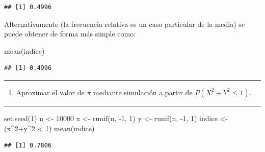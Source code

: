 \documentclass[
]{book}
\newenvironment{Shaded}{\begin{snugshade}}{\end{snugshade}}
\newcommand{\DecValTok}[1]{\textcolor[rgb]{0.00,0.00,0.81}{#1}}
\newcommand{\FunctionTok}[1]{\textcolor[rgb]{0.00,0.00,0.00}{#1}}
\newcommand{\NormalTok}[1]{#1}
\newcommand{\OtherTok}[1]{\textcolor[rgb]{0.56,0.35,0.01}{#1}}
\newcommand{\SpecialCharTok}[1]{\textcolor[rgb]{0.00,0.00,0.00}{#1}}
\providecommand{\tightlist}{%
  \setlength{\itemsep}{0pt}\setlength{\parskip}{0pt}}
\theoremstyle{break}
\theoremstyle{nonumberplain}
\begin{document}
\begin{verbatim}
## [1] 0.4996
\end{verbatim}

Alternativamente (la frecuencia relativa es un caso particular de la media) se puede obtener de forma más simple como:

\begin{Shaded}
\begin{Highlighting}[]
\FunctionTok{mean}\NormalTok{(indice)}
\end{Highlighting}
\end{Shaded}

\begin{verbatim}
## [1] 0.4996
\end{verbatim}

\begin{center}\rule{0.5\linewidth}{0.5pt}\end{center}

\begin{enumerate}
\def\labelenumi{\alph{enumi})}
\setcounter{enumi}{1}
\tightlist
\item
  Aproximar el valor de \(\pi\) mediante simulación a partir de
  \(P\left( X^2 +Y^2 \leq 1 \right)\).
\end{enumerate}

\begin{center}\rule{0.5\linewidth}{0.5pt}\end{center}

\begin{Shaded}
\begin{Highlighting}[]
\FunctionTok{set.seed}\NormalTok{(}\DecValTok{1}\NormalTok{)}
\NormalTok{n }\OtherTok{\textless{}{-}} \DecValTok{10000}
\NormalTok{x }\OtherTok{\textless{}{-}} \FunctionTok{runif}\NormalTok{(n, }\SpecialCharTok{{-}}\DecValTok{1}\NormalTok{, }\DecValTok{1}\NormalTok{)}
\NormalTok{y }\OtherTok{\textless{}{-}} \FunctionTok{runif}\NormalTok{(n, }\SpecialCharTok{{-}}\DecValTok{1}\NormalTok{, }\DecValTok{1}\NormalTok{)}
\NormalTok{indice }\OtherTok{\textless{}{-}}\NormalTok{ (x}\SpecialCharTok{\^{}}\DecValTok{2}\SpecialCharTok{+}\NormalTok{y}\SpecialCharTok{\^{}}\DecValTok{2} \SpecialCharTok{\textless{}} \DecValTok{1}\NormalTok{)}
\FunctionTok{mean}\NormalTok{(indice)}
\end{Highlighting}
\end{Shaded}

\begin{verbatim}
## [1] 0.7806
\end{verbatim}
\end{document}
